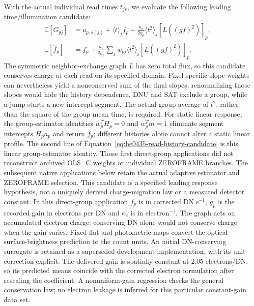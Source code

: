With the actual individual read times $t_{jr}$, we evaluate the
following leading time/illumination candidate:
\begin{align}
 \mathbb E[G_{pj}]&=a_{p,s(j)}+\langle t\rangle_j f_p
            +\frac{\kappa_e}{2g_p}\langle t^2\rangle_j
                    [L((gf)^2)]_p,\label{eq:he0435-read-history-candidate}\\
 \mathbb E[\widehat f_p]&=f_p+
       \frac{\kappa_e}{2g_p}\sum_j w_{pj}\langle t^2\rangle_j
                    [L((gf)^2)]_p .\nonumber
\end{align}
The symmetric neighbor-exchange graph $L$ has zero total flux, so this
candidate conserves charge at each read on its specified domain.
Pixel-specific slope weights can nevertheless yield a nonconserved sum
of the final slopes; renormalizing those slopes would hide the history
dependence. DNU and SAT exclude a group, while a jump starts a new
intercept segment. The actual group average of $t^2$, rather than the
square of the group mean time, is required. For static linear response,
the group-estimator identities $w_p^TH_p=0$ and $w_p^Tm=1$
eliminate segment intercepts $H_p a_p$ and return $f_p$;
different histories alone cannot alter a static linear profile.
The second line of Equation~\eqref{eq:he0435-read-history-candidate}
is this linear group-estimator identity. Those first direct-group applications did not reconstruct archived OLS\_C
weights or individual ZEROFRAME branches. The subsequent native applications
below retain the actual adaptive estimator and ZEROFRAME selection.
This candidate is a specified leading response hypothesis, not a
uniquely derived charge-migration law or a measured detector constant.
In this direct-group application $f_p$ is in corrected DN s$^{-1}$,
$g_p$ is the recorded gain in electrons per DN and $\kappa_e$ is in
electron$^{-1}$. The graph acts on accumulated electron charge; conserving
DN alone would not conserve charge when the gain varies. Fixed flat and
photometric maps convert the optical surface-brightness prediction to
the count units. An initial DN-conserving surrogate is retained as a
superseded development implementation, with its unit correction explicit.
The delivered gain is spatially constant at $2.05$ electrons/DN, so its
predicted means coincide with the corrected electron formulation after
rescaling the coefficient. A nonuniform-gain regression checks the
general conservation law; no electron leakage is inferred for this
particular constant-gain data set.

